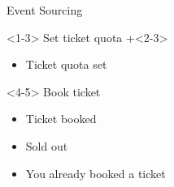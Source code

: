 \begin{frame}[fragile]{Event Sourcing}
\begin{minipage}{.7\textwidth}
\begin{onlyenv}
\end{onlyenv}
\end{minipage} \hfill
\begin{minipage}{0.25\textwidth}
\small
\begin{onlyenv}<1-3>
Set ticket quota
\onslide+<2-3>
\begin{itemize}
\item Ticket quota set
\end{itemize}
\end{onlyenv}
\begin{onlyenv}<4-5>
Book ticket
\begin{itemize}
\item Ticket booked
\item Sold out
\item You already booked a ticket
\end{itemize}
\end{onlyenv}
\end{minipage}

\end{frame}

